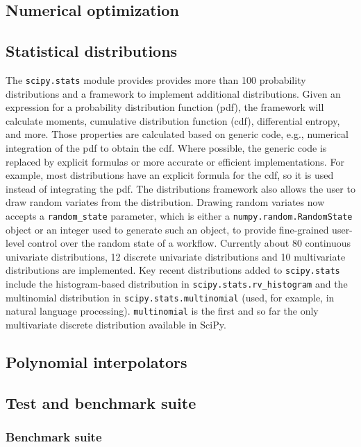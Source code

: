 \documentclass[fleqn,10pt]{wlscirep}
\begin{document}
\subsection*{Numerical optimization}



\subsection*{Statistical distributions}
The \texttt{scipy.stats} module provides provides more than 100 probability
distributions and a framework to implement additional distributions. Given
an expression for a probability distribution function (pdf),
the framework will calculate moments, cumulative distribution function (cdf),
differential entropy, and more. Those properties are calculated based on
generic code, e.g., numerical integration of the pdf to obtain the cdf.
Where possible, the generic code is replaced by explicit formulas or more
accurate or efficient implementations. For example, most distributions have
an explicit formula for the cdf, so it is used instead of integrating the
pdf. The distributions framework also allows the user to draw random
variates from the distribution. Drawing random variates now accepts a \texttt{random\_state}
parameter, which is either a \texttt{numpy.random.RandomState} object or an
integer used to generate such an object, to provide fine-grained user-level
control over the random state of a workflow.
Currently about 80 continuous univariate distributions, 12 discrete univariate
distributions and 10 multivariate distributions are implemented.
Key recent distributions added to \texttt{scipy.stats} include the histogram-based
distribution in \texttt{scipy.stats.rv\_histogram} and the multinomial
distribution in \texttt{scipy.stats.multinomial} (used, for example, in natural
language processing\cite{Griffiths5228}). \texttt{multinomial} is the first and so 
far the only multivariate discrete distribution available in SciPy.


\subsection*{Polynomial interpolators}


\subsection*{Test and benchmark suite}

    \subsubsection*{Benchmark suite}
\end{document}
